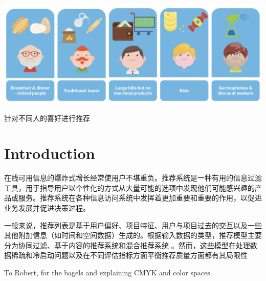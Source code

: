 \documentclass[sigconf]{acmart}
\begin{document}

\begin{teaserfigure}
  \includegraphics[width=\textwidth]{img/teaser.png}
  \caption{针对不同人的喜好进行推荐}
  \label{fig:teaser}
\end{teaserfigure}

\maketitle

\section{Introduction}
在线可用信息的爆炸式增长经常使用户不堪重负。推荐系统是一种有用的信息过滤工具，用于指导用户以个性化的方式从大量可能的选项中发现他们可能感兴趣的产品或服务。推荐系统在各种信息访问系统中发挥着更加重要和重要的作用，以促进业务发展并促进决策过程。

一般来说，推荐列表是基于用户偏好、项目特征、用户与项目过去的交互以及一些其他附加信息（如时间和空间数据）生成的。根据输入数据的类型，推荐模型主要分为协同过滤、基于内容的推荐系统和混合推荐系统 \cite{adomavicius2005toward} 。然而，这些模型在处理数据稀疏和冷启动问题以及在不同评估指标方面平衡推荐质量方面都有其局限性


\begin{acks}
  To Robert, for the bagels and explaining CMYK and color spaces.
\end{acks}



  
\end{document}
